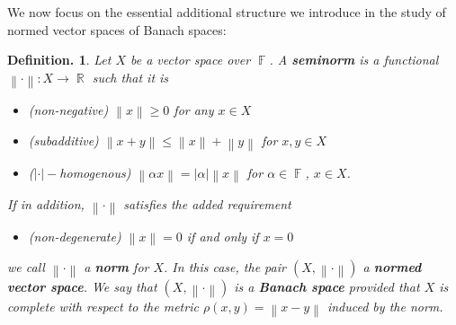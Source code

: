 \documentclass[11pt, a4paper]{memoir}
\DeclareMathOperator{\R}{{\mathbb{R}}}
\DeclareMathOperator{\F}{{\mathbb{F}}}
\newcommand{\norm}[1]{\ensuremath{\left\lVert#1\right\rVert}}
\newcommand{\abs}[1]{\ensuremath{\left\lvert#1\right\rvert}}
\theoremstyle{change}
\theoremstyle{plain}
\theoremstyle{nonumberplain}
\newtheorem{definition}{Definition.}
\numberwithin{equation}{section}
\begin{document}
We now focus on the essential additional structure we introduce in the study of normed vector spaces of Banach spaces:
\begin{definition}
    Let $X$ be a vector space over $\F$.
    A \textbf{seminorm} is a functional $\norm{\cdot}:X\to\R$ such that it is
    \begin{itemize}[nl]
        \item \textit{(non-negative)} $\norm{x}\geq 0$ for any $x\in X$
        \item \textit{(subadditive)} $\norm{x+y}\leq\norm{x}+\norm{y}$ for $x,y\in X$
        \item \textit{($\abs{\cdot}-$homogenous)} $\norm{\alpha x}=\abs{\alpha}\norm{x}$ for $\alpha\in\F$, $x\in X$.
    \end{itemize}
    If in addition, $\norm{\cdot}$ satisfies the added requirement
    \begin{itemize}[nl]
        \item \textit{(non-degenerate)} $\norm{x}=0$ if and only if $x=0$
    \end{itemize}
    we call $\norm{\cdot}$ a \textbf{norm} for $X$.
    In this case, the pair $(X,\norm{\cdot})$ a \textbf{normed vector space}.
    We say that $(X,\norm{\cdot})$ is a \textbf{Banach space} provided that $X$ is complete with respect to the metric $\rho(x,y)=\norm{x-y}$ induced by the norm.
\end{definition}
\end{document}
